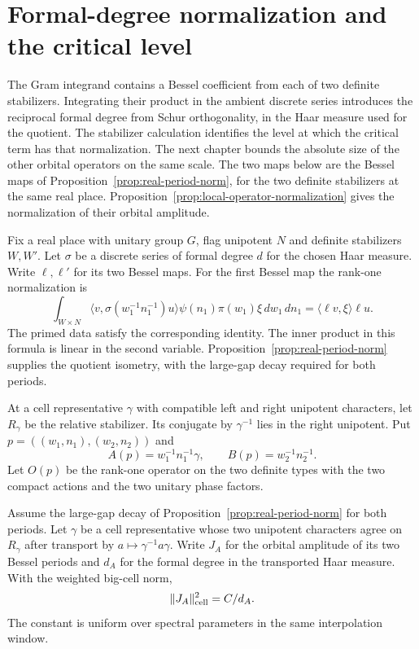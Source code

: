 \section{Formal-degree normalization and the critical level}
\label{sec:local-amplitudes}

The Gram integrand contains a Bessel coefficient from each of two definite stabilizers. Integrating their product in the ambient discrete series introduces the reciprocal formal degree from Schur orthogonality, in the Haar measure used for the quotient. The stabilizer calculation identifies
the level at which the critical term has that normalization.
The next chapter bounds the absolute size of the other
orbital operators on the same scale. The two maps below are the Bessel maps of Proposition~\ref{prop:real-period-norm}, for the two definite stabilizers at the same real place. Proposition~\ref{prop:local-operator-normalization} gives the normalization of their orbital amplitude.

Fix a real place with unitary group \(G\), flag unipotent \(N\)
and definite stabilizers \(W,W'\). Let \(\sigma\) be a
discrete series of formal degree \(d\) for the chosen Haar
measure. Write \(\ell,\ell'\) for its two Bessel maps. For the first Bessel map the rank-one normalization is
\[
 \int_{W\times N} \langle v,\sigma(w_1^{-1}n_1^{-1})u\rangle
          \psi(n_1)\pi(w_1)\xi\,dw_1\,dn_1
   =\langle\ell v,\xi\rangle\ell u .
\]
The primed data satisfy the corresponding identity. The inner product in this
formula is linear in the second variable. Proposition~\ref{prop:real-period-norm} supplies the quotient
isometry, with the large-gap decay required for both periods.

At a cell representative \(\gamma\) with compatible left and
right unipotent characters, let \(R_\gamma\) be the relative
stabilizer. Its conjugate by \(\gamma^{-1}\) lies in the right
unipotent. Put \(p=((w_1,n_1),(w_2,n_2))\) and
\[
 A(p)=w_1^{-1}n_1^{-1}\gamma,\qquad B(p)=w_2^{-1}n_2^{-1}.
\]
Let \(O(p)\) be the rank-one operator on the two definite types
with the two compact actions and the two unitary phase factors.
\begin{proposition}\label{prop:local-operator-normalization}
Assume the large-gap decay of Proposition~\ref{prop:real-period-norm} for both periods. Let \(\gamma\) be a cell representative whose two unipotent characters agree on \(R_\gamma\) after transport by \(a\mapsto\gamma^{-1}a\gamma\). Write \(J_A\) for the orbital amplitude of its two Bessel periods and \(d_A\) for the formal degree in the transported Haar measure. With the weighted big-cell norm, 
\[
 \|J_A\|_{\rm cell}^2=C/d_A.
\]
 The constant is uniform over
spectral parameters in the same interpolation window.
\end{proposition}

